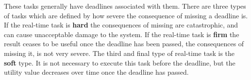 These tasks generally have deadlines associated with them. There are three types
of tasks which are defined by how severe the consequence of missing a
deadline is. If the real-time task is \textbf{hard} the consequences of missing
are catastrophic, and can cause unacceptable damage to the system. 
If the real-time task is \textbf{firm} the result ceases to be useful once the
deadline has been passed, the consequences of missing it, is not very severe.
The third and final type of real-time task is the \textbf{soft} type. It
is not necessary to execute this task before the deadline, but the utility
value decreases over time once the deadline has passed\citep[Chap 2]{Realtime}.




% 




